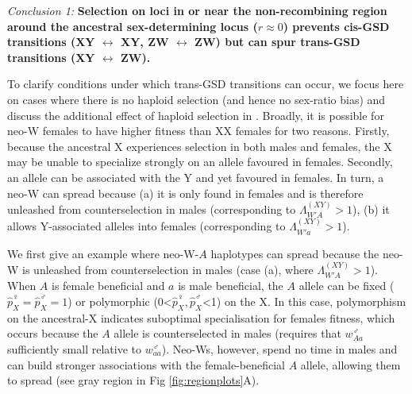\documentclass[10pt,letterpaper]{article}
\begin{document}
\noindent\textit{Conclusion 1:}
\textbf{Selection on loci in or near the non-recombining region around the ancestral sex-determining locus ($r\approx0$) prevents cis-GSD transitions (XY $\leftrightarrow$ XY, ZW $\leftrightarrow$ ZW) but can spur trans-GSD transitions (XY $\leftrightarrow$ ZW).}
\vspace{0.5cm}

\noindent 
To clarify conditions under which trans-GSD transitions can occur, we focus here on cases where there is no haploid selection (and hence no sex-ratio bias) and discuss the additional effect of haploid selection in . 
Broadly, it is possible for neo-W females to have higher fitness than XX females for two reasons.
Firstly, because the ancestral X experiences selection in both males and females, the X may be unable to specialize strongly on an allele favoured in females.
Secondly, an allele can be associated with the Y and yet favoured in females.
In turn, a neo-W can spread because (a) it is only found in females and is therefore unleashed from counterselection in males (corresponding to $\Lambda_{W'A}^{(XY)}>1$), (b) it allows Y-associated alleles into females (corresponding to $\Lambda_{W'a}^{(XY)}>1$).

We first give an example where neo-W-$A$ haplotypes can spread because the neo-W is unleashed from counterselection in males (case (a), where $\Lambda_{W'A}^{(XY)}>1$).
When $A$ is female beneficial and $a$ is male beneficial, the $A$ allele can be fixed ($\hat{p}^\female_X=\hat{p}^\male_X=1$) or polymorphic (0<$\hat{p}^\female_X, \hat{p}^\male_X$<1) on the X. 
In this case, polymorphism on the ancestral-X indicates suboptimal specialisation for females fitness, which occurs because the $A$ allele is counterselected in males (requires that $w^\male_{Aa}$  sufficiently small relative to $w^\male_{aa}$). 
Neo-Ws, however, spend no time in males and can build stronger associations with the female-beneficial $A$ allele, allowing them to spread (see gray region in Fig \ref{fig:regionplots}A).
\end{document}
